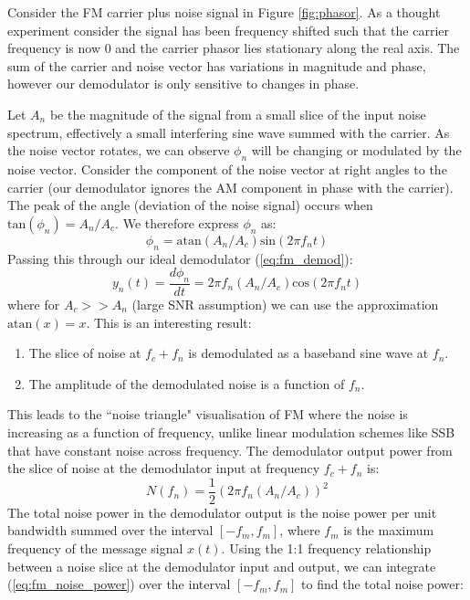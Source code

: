 \documentclass{article}
\begin{document}
Consider the FM carrier plus noise signal in Figure \ref{fig:phasor}.  As a thought experiment consider the signal has been frequency shifted such that the carrier frequency is now 0 and the carrier phasor lies stationary along the real axis.  The sum of the carrier and noise vector has variations in magnitude and phase, however our demodulator is only sensitive to changes in phase. 

Let $A_n$ be the magnitude of the signal from a small slice of the input noise spectrum, effectively a small interfering sine wave summed with the carrier. As the noise vector rotates, we can observe $\phi_n$ will be changing or modulated by the noise vector. Consider the component of the noise vector at right angles to the carrier (our demodulator ignores the AM component in phase with the carrier). The peak of the angle (deviation of the noise signal) occurs when $\mathrm{tan}(\phi_n) = A_n/A_c$.  We therefore express $\phi_n$ as:
\begin{equation}
\phi_n = \mathrm{atan}(A_n/A_c)\mathrm{sin}(2 \pi f_n t)
\end{equation}
Passing this through our ideal demodulator (\ref{eq:fm_demod}):
\begin{equation}
y_n(t) = \frac{d\phi_n}{dt} =  2 \pi f_n (A_n/A_c) \mathrm{cos}(2 \pi f_n t)
\end{equation}
where for $A_c>>A_n$ (large SNR assumption) we can use the approximation $\mathrm{atan}(x)=x$.
This is an interesting result:
\begin{enumerate}
\item The slice of noise at $f_c+f_n$ is demodulated as a baseband sine wave at $f_n$.
\item The amplitude of the demodulated noise is a function of $f_n$.
\end{enumerate}
This leads to the ``noise triangle" visualisation of FM where the noise is increasing as a function of frequency, unlike linear modulation schemes like SSB that have constant noise across frequency. The demodulator output power from the slice of noise at the demodulator input at frequency $f_c+f_n$ is:
\begin{equation}
\label{eq:fm_noise_power}
N(f_n) =  \frac{1}{2}(2 \pi f_n (A_n/A_c) )^2 
\end{equation}
The total noise power in the demodulator output is the noise power per unit bandwidth summed over the interval $[-f_m,f_m]$, where $f_m$ is the maximum frequency of the message signal $x(t)$. Using the 1:1 frequency relationship between a noise slice at the demodulator input and output, we can integrate (\ref{eq:fm_noise_power}) over the interval $[-f_m,f_m]$ to find the total noise power:
\end{document}
